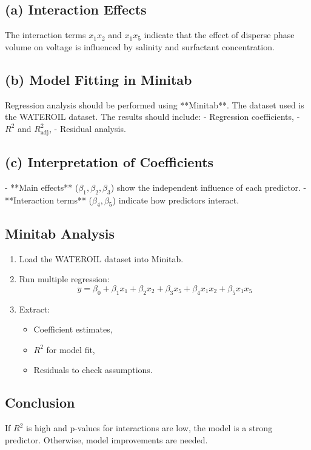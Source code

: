 \documentclass{article}
\begin{document}
\subsection{(a) Interaction Effects}
The interaction terms \( x_1 x_2 \) and \( x_1 x_5 \) indicate that the effect of disperse phase volume on voltage is influenced by salinity and surfactant concentration.

\subsection{(b) Model Fitting in Minitab}
Regression analysis should be performed using **Minitab**. The dataset used is the WATEROIL dataset. The results should include:
- Regression coefficients,
- \( R^2 \) and \( R^2_{\text{adj}} \),
- Residual analysis.

\subsection{(c) Interpretation of Coefficients}
- **Main effects** (\(\beta_1, \beta_2, \beta_3\)) show the independent influence of each predictor.
- **Interaction terms** (\(\beta_4, \beta_5\)) indicate how predictors interact.

\subsection{Minitab Analysis}
\begin{enumerate}
    \item Load the WATEROIL dataset into Minitab.
    \item Run multiple regression:
    \[
    y = \beta_0 + \beta_1 x_1 + \beta_2 x_2 + \beta_3 x_5 + \beta_4 x_1 x_2 + \beta_5 x_1 x_5
    \]
    \item Extract:
    \begin{itemize}
        \item Coefficient estimates,
        \item \( R^2 \) for model fit,
        \item Residuals to check assumptions.
    \end{itemize}
\end{enumerate}

\subsection{Conclusion}
If \( R^2 \) is high and p-values for interactions are low, the model is a strong predictor. Otherwise, model improvements are needed.
\end{document}
